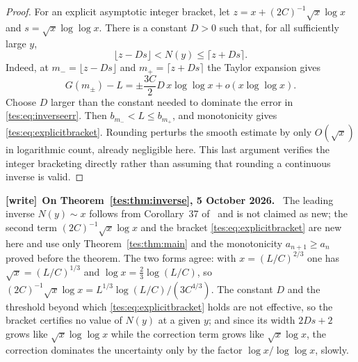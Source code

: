 \documentclass[11pt,a4paper]{article}
\theoremstyle{remark}\newtheorem{remark}[theorem]{Remark}
\numberwithin{equation}{section}
\newenvironment{writenote}[1][]{\par\smallskip\begingroup\small
 \noindent\textbf{[write]}\if\relax\detokenize{#1}\relax\else~\textbf{#1.}\fi\ }%
 {\par\endgroup\smallskip}
\begin{document}
\begin{proof}
For an explicit asymptotic integer bracket, let
$z=x+(2C)^{-1}\sqrt x\log x$ and $s=\sqrt x\log\log x$. There is a constant $D>0$ such that, for all sufficiently large $y$,
\begin{equation}\label{tes:eq:explicitbracket}
\lfloor z-Ds\rfloor<N(y)\le\lceil z+Ds\rceil.
\end{equation}
Indeed, at $m_-=\lfloor z-Ds\rfloor$ and $m_+=\lceil z+Ds\rceil$ the Taylor expansion gives
\[
G(m_\pm)-L=\pm\frac{3C}{2}D\,x\log\log x+o(x\log\log x).
\]
Choose $D$ larger than the constant needed to dominate the error in \eqref{tes:eq:inverseerr}. Then $b_{m_-}<L\le b_{m_+}$, and monotonicity gives \eqref{tes:eq:explicitbracket}. Rounding perturbs the smooth estimate by only $O(\sqrt x)$ in logarithmic count, already negligible here. This last argument verifies the integer bracketing directly rather than assuming that rounding a continuous inverse is valid.
\end{proof}

\begin{writenote}[On Theorem~\ref{tes:thm:inverse}, 5 October 2026]
The leading inverse $N(y)\sim x$ follows from Corollary~37 of~\cite{bbm}
and is not claimed as new; the second term $(2C)^{-1}\sqrt x\log x$ and the
bracket \eqref{tes:eq:explicitbracket} are new here and use only
Theorem~\ref{tes:thm:main} and the monotonicity $a_{n+1}\ge a_n$ proved
before the theorem. The two forms agree: with $x=(L/C)^{2/3}$ one has
$\sqrt x=(L/C)^{1/3}$ and $\log x=\frac23\log(L/C)$, so
$(2C)^{-1}\sqrt x\log x=L^{1/3}\log(L/C)/(3C^{4/3})$. The constant $D$ and
the threshold beyond which \eqref{tes:eq:explicitbracket} holds are not
effective, so the bracket certifies no value of $N(y)$ at a given $y$; and
since its width $2Ds+2$ grows like $\sqrt x\log\log x$ while the correction
term grows like $\sqrt x\log x$, the correction dominates the uncertainty
only by the factor $\log x/\log\log x$, slowly.
\end{writenote}
\end{document}

